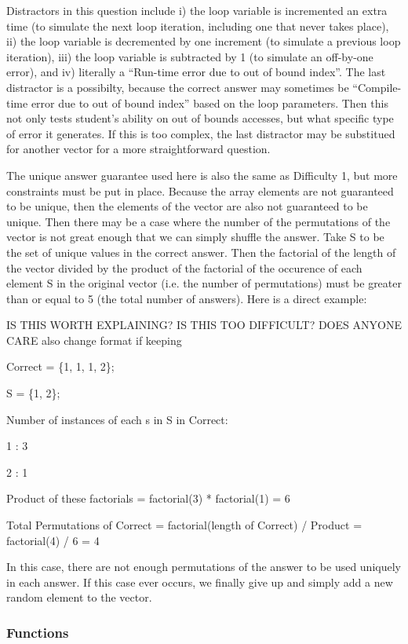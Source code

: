 \documentclass{article}
\begin{document}
Distractors in this question include i) the loop variable is incremented an extra time (to simulate the next loop iteration, including one that never takes place), ii) the loop variable is decremented by one increment (to simulate a previous loop iteration), iii) the loop variable is subtracted by 1 (to simulate an off-by-one error), and iv) literally a ``Run-time error due to out of bound index''.
The last distractor is a possibilty, because the correct answer may sometimes be ``Compile-time error due to out of bound index'' based on the loop parameters. Then this not only tests 
student's ability on out of bounds accesses, but what specific type of error it generates. If this is too complex, the last distractor may be substitued for another vector for a more straightforward
question.

The unique answer guarantee used here is also the same as Difficulty 1, but more constraints must be put in place. Because the array elements are not guaranteed to be unique, then the
elements of the vector are also not guaranteed to be unique. Then there may be a case where the number of the permutations of the vector is not great enough that we can simply shuffle 
the answer. Take S to be the set of unique values in the correct answer. Then the factorial of the length of the vector divided by the product of the factorial of the occurence of each element S 
in the original vector (i.e. the number of permutations) must be greater than or equal to 5 (the total number of answers). Here is a direct example:


IS THIS WORTH EXPLAINING? IS THIS TOO DIFFICULT? DOES ANYONE CARE
also change format if keeping 

Correct = \{1, 1, 1, 2\}; \par
S = \{1, 2\}; \par
Number of instances of each s in S in Correct: \par
1 : 3 \par
2 : 1 \par
Product of these factorials = factorial(3) * factorial(1) = 6\par
Total Permutations of Correct = factorial(length of Correct) / Product = factorial(4) / 6 = 4 \par

In this case, there are not enough permutations of the answer to be used uniquely in each answer. If this case ever occurs, we finally give up and simply add a new random element to the 
vector.

\subsubsection{Functions}
\end{document}
